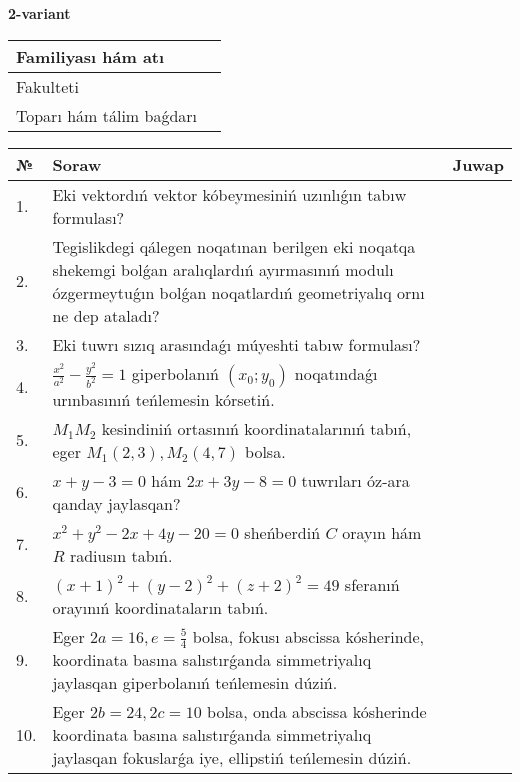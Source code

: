 \documentclass{article}
\begin{document}
\egroup

\newpage


\textbf{2-variant}\\

\bgroup
\def\arraystretch{1.6} %

\begin{tabular}{|m{5.7cm}|m{9.5cm}|}
\hline
Familiyası hám atı & \\
\hline
Fakulteti  & \\
\hline
Toparı hám tálim baǵdarı  & \\
\hline
\end{tabular}

\vspace{1cm}

\begin{tabular}{|m{0.7cm}|m{10cm}|m{4cm}|}
\hline
№ & Soraw & Juwap \\
\hline
1. & Eki vektordıń vektor kóbeymesiniń uzınlıǵın tabıw formulası? &  \\
\hline
2. & Tegislikdegi qálegen noqatınan berilgen eki noqatqa shekemgi bolǵan aralıqlardıń ayırmasınıń modulı ózgermeytuǵın bolǵan noqatlardıń geometriyalıq ornı ne dep ataladı? &  \\
\hline
3. & Eki tuwrı sızıq arasındaǵı múyeshti tabıw formulası? &  \\
\hline
4. & $\frac{x^2}{a^2}-\frac{y^2}{b^2}=1$ giperbolanıń $(x_0;y_0)$ noqatındaǵı urınbasınıń teńlemesin kórsetiń. &  \\
\hline
5. & $M_{1}M_{2}$ kesindiniń ortasınıń koordinatalarınıń tabıń, eger $M_{1} (2, 3), M_{2} (4, 7)$ bolsa. &  \\
\hline
6. & $x+y-3=0$ hám $2x+3y-8=0$ tuwrıları óz-ara qanday jaylasqan? &  \\
\hline
7. & $x^{2}+y^{2}-2x+4y-20=0$ sheńberdiń $C$ orayın hám $R$ radiusın tabıń. &  \\
\hline
8. & $(x+1)^{2}+(y-2) ^{2}+(z+2) ^{2}=49$ sferanıń orayınıń koordinataların tabıń. &  \\
\hline
9. & Eger $2a=16, e=\frac{5}{4}$ bolsa, fokusı abscissa kósherinde, koordinata basına salıstırǵanda simmetriyalıq jaylasqan giperbolanıń teńlemesin dúziń. &  \\
\hline
10. & Eger $2b=24, 2 c=10$ bolsa, onda abscissa kósherinde koordinata basına salıstırǵanda simmetriyalıq jaylasqan fokuslarǵa iye, ellipstiń teńlemesin dúziń. &  \\
\hline
\end{tabular}
\end{document}
